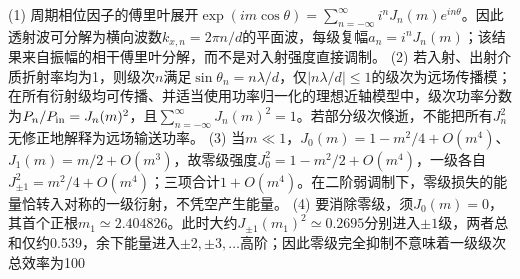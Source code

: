(1) 周期相位因子的傅里叶展开\(\exp(im\cos\theta)=\sum_{n=-\infty}^\infty i^nJ_n(m)e^{in\theta}\)。因此透射波可分解为横向波数\(k_{x,n}=2\pi n/d\)的平面波，每级复幅\(a_n=i^nJ_n(m)\)；该结果来自振幅的相干傅里叶分解，而不是对入射强度直接调制。
(2) 若入射、出射介质折射率均为1，则级次\(n\)满足\(\sin\theta_n=n\lambda/d\)，仅\(|n\lambda/d|\le1\)的级次为远场传播模；在所有衍射级均可传播、并适当使用功率归一化的理想近轴模型中，级次功率分数为\(P_n/P_{\rm in}=J_n(m)^2\)，且\(\sum_{n=-\infty}^\infty J_n(m)^2=1\)。若部分级次倏逝，不能把所有\(J_n^2\)无修正地解释为远场输送功率。
(3) 当\(m\ll1\)，\(J_0(m)=1-m^2/4+O(m^4)\)、\(J_1(m)=m/2+O(m^3)\)，故零级强度\(J_0^2=1-m^2/2+O(m^4)\)，一级各自\(J_{\pm1}^2=m^2/4+O(m^4)\)；三项合计\(1+O(m^4)\)。在二阶弱调制下，零级损失的能量恰转入对称的一级衍射，不凭空产生能量。
(4) 要消除零级，须\(J_0(m)=0\)，其首个正根\(m_1\simeq2.404826\)。此时大约\(J_{\pm1}(m_1)^2\simeq0.2695\)分别进入\(\pm1\)级，两者总和仅约0.539，余下能量进入\(\pm2,\pm3,\ldots\)高阶；因此零级完全抑制不意味着一级级次总效率为100%
